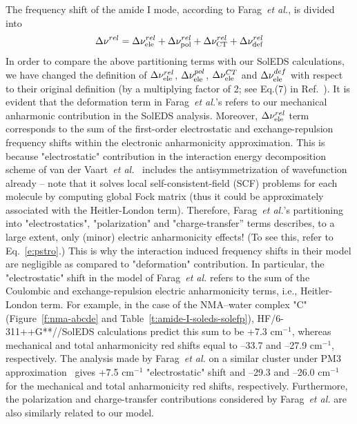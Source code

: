 \documentclass[a4paper,titlepage,twoside,fleqn,12pt]{book}
\begin{document}
\begin{refsection}
The frequency shift of the amide I mode, according to Farag~\emph{et al.}, is divided into
%
\begin{equation} \label{e:cooo2}
 \Delta\nu^{rel} =  \Delta\nu_{\rm ele}^{rel} +
                    \Delta\nu_{\rm pol}^{rel} +
                    \Delta\nu_{\rm CT}^{rel} +
                    \Delta\nu_{\rm def}^{rel}
\end{equation}
%
In order to compare the above partitioning terms with our SolEDS calculations, we have
changed the definition of $\Delta\nu_{\rm ele}^{rel}$, $\Delta\nu_{\rm ele}^{pol}$,
$\Delta\nu_{\rm ele}^{CT}$ and $\Delta\nu_{\rm ele}^{def}$ with respect to their 
original definition (by a multiplying factor of 2; see Eq.(7) 
in Ref.~\citep{Farag.Ruiz-Lopez.Bastida.Monard.Ingrosso.JPCB.2015}). 
It is evident that the deformation term in Farag~\emph{et al.}'s 
refers to our mechanical anharmonic contribution in the SolEDS analysis.
Moreover, $\Delta\nu_{\rm ele}^{rel}$ term corresponds to the sum of the 
first\hyp{}order electrostatic and exchange\hyp{}repulsion frequency shifts 
within the electronic anharmonicity approximation. This is because 
"electrostatic" contribution in the interaction energy decomposition 
scheme of van der Vaart~\emph{et al.}~\citep{vanderVaart.Merz.JPCA.1999}  
includes the antisymmetrization of wavefunction 
already -- note that it solves local self\hyp{}consistent\hyp{}field (SCF) 
problems for each molecule by computing global Fock matrix 
(thus it could be approximately associated with the Heitler\hyp{}London term). 
Therefore, Farag~\emph{et al.}'s partitioning into
"electrostatics", "polarization" and "charge\hyp{}transfer” terms
describes, to a large extent, only (minor) electric anharmonicity
effects! (To see this, refer to Eq.~\eqref{e:pstro}.) This is
why the interaction induced frequency shifts in their model
are negligible as compared to "deformation" contribution.
In particular, the "electrostatic" shift in the model of Farag~\emph{et al.}
refers to the sum of the Coulombic and exchange\hyp{}repulsion
electric anharmonicity terms, i.e., Heitler\hyp{}London
term. For example, in the case of the NMA--water complex "C"
(Figure~\ref{f:nma-abcde} and Table~\ref{t:amide-I-soleds-solefp}), 
HF/6-311++G**//SolEDS calculations predict
this sum to be +7.3 cm$^{-1}$, whereas mechanical and total
anharmonicity red shifts equal to --33.7 and --27.9 cm$^{-1}$,
respectively. The analysis made by Farag~\emph{et al.} on a similar
cluster under PM3 approximation~\citep{Stewart.JCC.1988} 
gives +7.5 cm$^{-1}$ "electrostatic"
shift and --29.3 and --26.0 cm$^{-1}$ for the mechanical and
total anharmonicity red shifts, respectively. Furthermore, the
polarization and charge\hyp{}transfer contributions considered by
Farag~\emph{et al.} are also similarly related to our model. 


\end{refsection}
\end{document}
